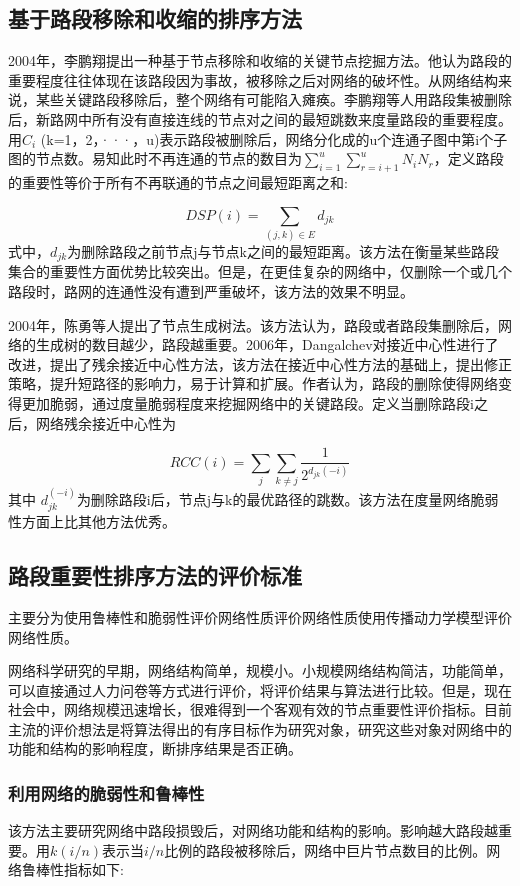 	\subsection{基于路段移除和收缩的排序方法}
	2004年，李鹏翔提出一种基于节点移除和收缩的关键节点挖掘方法\parencite{lpx2004wl}。他认为路段的重要程度往往体现在该路段因为事故，被移除之后对网络的破坏性。从网络结构来说，某些关键路段移除后，整个网络有可能陷入瘫痪。李鹏翔等人用路段集被删除后，新路网中所有没有直接连线的节点对之间的最短跳数来度量路段的重要程度。用$C_i$ (k=1，2，···，u)表示路段被删除后，网络分化成的u个连通子图中第i个子图的节点数。易知此时不再连通的节点的数目为$\sum\limits_{i = 1}^u {\sum\limits_{r = i + 1}^u {{N_i}{N_r}} } $，定义路段的重要性等价于所有不再联通的节点之间最短距离之和:

	$$DSP(i)=\sum\limits_{(j,k)\in E} {{d_{jk}}}$$
	式中，$d_{jk}$为删除路段之前节点j与节点k之间的最短距离。该方法在衡量某些路段集合的重要性方面优势比较突出。但是，在更佳复杂的网络中，仅删除一个或几个路段时，路网的连通性没有遭到严重破坏，该方法的效果不明显。

	2004年，陈勇等人提出了节点生成树法\parencite{cy2004tx}。该方法认为，路段或者路段集删除后，网络的生成树的数目越少，路段越重要。2006年，Dangalchev对接近中心性进行了改进，提出了残余接近中心性方法\parencite{Dangalchev2006Residual}，该方法在接近中心性方法的基础上，提出修正策略，提升短路径的影响力，易于计算和扩展。作者认为，路段的删除使得网络变得更加脆弱，通过度量脆弱程度来挖掘网络中的关键路段。定义当删除路段i之后，网络残余接近中心性为

				$$RCC(i)=\sum\limits_j {\sum\limits_{k\ne j} {\frac{1}{2^{d_{jk}(-i)}}}} $$
	其中 $d_{jk}^{(-i)}$为删除路段i后，节点j与k的最优路径的跳数。该方法在度量网络脆弱性方面上比其他方法优秀。

	\subsection{路段重要性排序方法的评价标准}
	主要分为使用鲁棒性和脆弱性评价网络性质评价网络性质使用传播动力学模型评价网络性质。

	网络科学研究的早期，网络结构简单，规模小。小规模网络结构简洁，功能简单，可以直接通过人力问卷等方式进行评价，将评价结果与算法进行比较。但是，现在社会中，网络规模迅速增长，很难得到一个客观有效的节点重要性评价指标。目前主流的评价想法是将算法得出的有序目标作为研究对象，研究这些对象对网络中的功能和结构的影响程度，断排序结果是否正确。
	\subsubsection{利用网络的脆弱性和鲁棒性}
	该方法主要研究网络中路段损毁后，对网络功能和结构的影响。影响越大路段越重要。用$k(i/n)$表示当$i/n$比例的路段被移除后，网络中巨片\parencite{Dereich2013Random}节点数目的比例。网络鲁棒性指标如下\parencite{Schneider2011Mitigation}:

